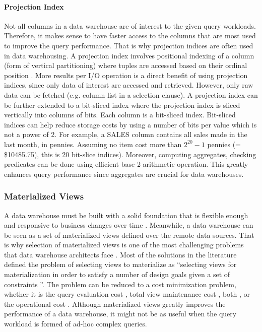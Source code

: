 \documentclass[12pt,a4paper]{article}
\begin{document}
\paragraph{Projection Index}
Not all columns in a data warehouse are of interest to the given query workloads. Therefore, it makes sense to have faster access to the columns that are
most used to improve the query performance. That is why projection indices are often used in data warehousing. A projection index involves positional indexing
of a column (form of vertical partitioning) where tuples are accessed based on their ordinal position \cite{datta2002parallel}. More results per I/O operation
is a direct benefit of using projection indices, since only data of interest are accessed and retrieved. However, only raw data can be fetched (e.g. column
list in a selection clause). A projection index can be further extended to a bit-sliced index \cite{oneil1997improved} where the projection index is sliced
vertically into columns of bits. Each column is a bit-sliced index. Bit-sliced indices can help reduce storage costs by using a number of bits per value which
is not a power of 2. For example, a SALES column contains all sales made in the last month, in pennies. Assuming no item cost more than $2^{20} - 1$ pennies (=
\$10485.75), this is 20 bit-slice indices). Moreover, computing aggregates, checking predicates can be done using efficient base-2 arithmetic operation. This
greatly enhances query performance since aggregates are crucial for data warehouses.

\subsubsection{Materialized Views}
A data warehouse must be built with a solid foundation that is flexible enough and responsive to business changes over time \cite{armstrong1997data}.
Meanwhile, a data warehouse can be seen as a set of materialized views defined over the remote data sources. That is why
selection of materialized
views is one of the most challenging problems that data warehouse architects face \cite{theodoratos2000general}. Most of the solutions in the literature
defined the problem of selecting views to materialize as \textquotedblleft selecting views for materialization in order to satisfy a number of design goals
given a set of constraints \textquotedblright. The problem can be reduced to a cost minimization problem, whether it is the query evaluation cost
\cite{harinarayan1996implementing}, total view maintenance cost \cite{kenneth1996materialized}, both \cite{yang1997algorithms}, or the operational cost
\cite{elena1997materialized, gupta2005selection, theodoratos1999designing, theodoratos1997data, theodoratos1999designingdw, theodoratos2000incremental,
yang1997algorithms}. Although materialized views greatly improves the performance of a data warehouse, it might not be as useful when the query workload is
formed of ad-hoc complex queries.
\end{document}
